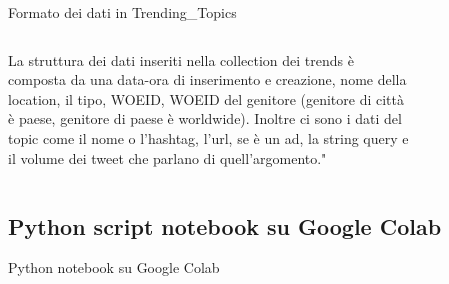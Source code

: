 \documentclass[xcolor=svgnames, aspectratio=169]{beamer}
\begin{document}
\begin{frame}{Formato dei dati in Trending\_Topics}
    \begin{columns}[t]
        La struttura dei dati inseriti nella collection dei trends è composta da una data-ora di inserimento e creazione, nome della location, il tipo, WOEID, WOEID del genitore (genitore di città è paese, genitore di paese è worldwide). Inoltre ci sono i dati del topic come il nome o l'hashtag, l'url, se è un ad, la string query e il volume dei tweet che parlano di quell'argomento."
        
        \vspace*{-16pt}
        \begin{figure}[H]
            \centering
            \noindent{}
        \end{figure}
    \end{columns}
\end{frame}


\subsection{Python script notebook su Google Colab}

\begin{frame}{Python notebook su Google Colab}
    \vspace*{-56pt}
    \begin{figure}[H]
        \centering
        \noindent{}
    \end{figure}
\end{frame}
\end{document}
